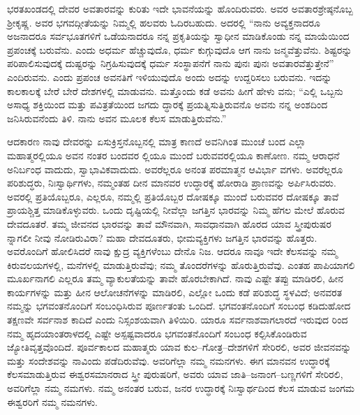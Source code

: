 ಭರತಖಂಡದಲ್ಲಿ ದೇವರ ಅವತಾರವನ್ನು ಕುರಿತು ಇದೇ ಭಾವನೆಯನ್ನು ಹೊಂದಿರುವರು. ಅವರ ಅವತಾರಶ್ರೇಷ್ಠನೊಬ್ಬ ಶ‍್ರೀಕೃಷ್ಣ. ಅವರ ಭಗವದ್ಗೀತೆಯನ್ನು ನಿಮ್ಮಲ್ಲಿ ಹಲವರು ಓದಿರಬಹುದು. ಅದರಲ್ಲಿ “ನಾನು ಅವ್ಯಕ್ತನಾದರೂ ಅಜನಾದರೂ ಸರ್ವಭೂತಗಳಿಗೆ ಒಡೆಯನಾದರೂ ನನ್ನ ಪ್ರಕೃತಿಯನ್ನು ಸ್ವಾಧೀನ ಮಾಡಿಕೊಂಡು ನನ್ನ ಮಾಯೆಯಿಂದ ಪ್ರಪಂಚಕ್ಕೆ ಬರುವೆನು. ಎಂದು ಅಧರ್ಮ ಹೆಚ್ಚುವುದೊ, ಧರ್ಮ ಕುಗ್ಗುವುದೊ ಆಗ ನಾನು ಜನ್ಮವೆತ್ತುವೆನು. ಶಿಷ್ಟರನ್ನು ಪರಿಪಾಲಿಸುವುದಕ್ಕೆ ದುಷ್ಟರನ್ನು ನಿಗ್ರಹಿಸುವುದಕ್ಕೆ ಧರ್ಮ ಸಂಸ್ಥಾಪನೆಗೆ ನಾನು ಪುನಃ ಪುನಃ ಅವತಾರವೆತ್ತುತ್ತೇನೆ” ಎಂದಿರುವನು. ಎಂದು ಪ್ರಪಂಚ ಅವನತಿಗೆ ಇಳಿಯುವುದೊ ಅಂದು ಅದನ್ನು ಉದ್ದರಿಸಲು ಬರುವನು. ಇದನ್ನು ಕಾಲಕಾಲಕ್ಕೆ ಬೇರೆ ಬೇರೆ ದೇಶಗಳಲ್ಲಿ ಮಾಡುವನು. ಮತ್ತೊಂದು ಕಡೆ ಅವನು ಹೀಗೆ ಹೇಳು ವನು; “ಎಲ್ಲಿ ಒಬ್ಬನು ಅಸಾಧ್ಯ ಶಕ್ತಿಯಿಂದ ಮತ್ತು ಪವಿತ್ರತೆಯಿಂದ ಜಗದು ದ್ಧಾರಕ್ಕೆ ಪ್ರಯತ್ನಿಸುತ್ತಿರುವನೊ ಅವನು ನನ್ನ ಅಂಶದಿಂದ ಜನಿಸಿರುವನೆಂದು ತಿಳಿ. ನಾನು ಅವನ ಮೂಲಕ ಕೆಲಸ ಮಾಡುತ್ತಿರುವೆನು.”

ಆದಕಾರಣ ನಾವು ದೇವರನ್ನು ಏಸುಕ್ರಿಸ್ತನೊಬ್ಬನಲ್ಲಿ ಮಾತ್ರ ಕಾಣದೆ ಅವನಿಗಿಂತ ಮುಂಚೆ ಬಂದ ಎಲ್ಲಾ ಮಹಾತ್ಮರಲ್ಲಿಯೂ ಅವನ ನಂತರ ಬಂದವರ ಲ್ಲಿಯೂ ಮುಂದೆ ಬರುವವರಲ್ಲಿಯೂ ಕಾಣೋಣ. ನಮ್ಮ ಆರಾಧನೆ ಅನಿರ್ಬಂಧ ವಾದುದು, ಸ್ವಾಭಾವಿಕವಾದುದು. ಅವರೆಲ್ಲರೂ ಅನಂತ ಪರಮಾತ್ಮನ ಆವಿರ್ಭಾ ವಗಳು. ಅವರೆಲ್ಲರೂ ಪರಿಶುದ್ಧರು, ನಿಃಸ್ವಾರ್ಥಿಗಳು, ನಮ್ಮಂತಹ ದೀನ ಮಾನವರ ಉದ್ಧಾರಕ್ಕೆ ಹೋರಾಡಿ ಪ್ರಾಣವನ್ನು ಅರ್ಪಿಸಿರುವರು. ಅವರಲ್ಲಿ ಪ್ರತಿಯೊಬ್ಬರೂ, ಎಲ್ಲರೂ, ನಮ್ಮಲ್ಲಿ ಪ್ರತಿಯೊಬ್ಬರ ದೋಷಕ್ಕೂ ಮುಂದೆ ಬರುವವರ ದೋಷಕ್ಕೂ ತಾವೆ ಪ್ರಾಯಶ್ಚಿತ್ತ ಮಾಡಿಕೊಳ್ಳುವರು. ಒಂದು ದೃಷ್ಟಿಯಲ್ಲಿ ನೀವೆಲ್ಲಾ ಜಗತ್ತಿನ ಭಾರವನ್ನು ನಿಮ್ಮ ಹೆಗಲ ಮೇಲೆ ಹೊರುವ ದೇವದೂತರೆ. ತಮ್ಮ ಜೀವನದ ಭಾರವನ್ನು ತಾವೆ ಮೌನವಾಗಿ, ಸಾವಧಾನವಾಗಿ ಹೊರದ ಯಾವ ಸ್ತ್ರೀಪುರುಷರ ನ್ನಾಗಲೀ ನೀವು ನೋಡಿರುವಿರಾ? ಮಹಾ ದೇವದೂತರು, ಭೀಮವ್ಯಕ್ತಿಗಳು ಜಗತ್ತಿನ ಭಾರವನ್ನು ಹೊತ್ತರು. ಅವರೊಂದಿಗೆ ಹೋಲಿಸಿದರೆ ನಾವು ಕ್ಷುದ್ರ ವ್ಯಕ್ತಿಗಳೆಂಬು ದೇನೊ ನಿಜ. ಆದರೂ ನಾವೂ ಇದೇ ಕೆಲಸವನ್ನು ನಮ್ಮ ಕಿರುವಲಯಗಳಲ್ಲಿ, ಮನೆಗಳಲ್ಲಿ ಮಾಡುತ್ತಿರುವೆವು; ನಮ್ಮ ತೊಂದರೆಗಳನ್ನು ಹೊರುತ್ತಿರುವೆವು. ಎಂತಹ ಪಾಪಿಯಾಗಲಿ ಮೂರ್ಖನಾಗಲಿ ಎಲ್ಲರೂ ತಮ್ಮ ವ್ಯಾಕುಲತೆಯನ್ನು ತಾವೇ ಹೊರಬೇಕಾಗಿದೆ. ನಾವು ಎಷ್ಟೇ ತಪ್ಪು ಮಾಡಿರಲಿ, ಹೀನ ಕಾರ್ಯಗಳನ್ನು ಮತ್ತು ಹೀನ ಆಲೋಚನೆಗಳನ್ನು ಮಾಡಿರಲಿ, ಎಲ್ಲೋ ಒಂದು ಕಡೆ ಪರಿಶುದ್ಧ ಸ್ಥಳವಿದೆ; ಅನವರತ ನಮ್ಮನ್ನು ಭಗವಂತ\-ನೊಂದಿಗೆ ಸಂಬಂಧಿಸಿರುವ ಪೂರ್ಣತಂತು ಒಂದಿದೆ. ಭಗವಂತನೊಂದಿಗೆ ಸಂಬಂಧ ಕಡಿದುಹೋದ ತಕ್ಷಣವೇ ಸರ್ವನಾಶ ಕಾದಿದೆ ಎಂದು ನಿಸ್ಸಂಶಯವಾಗಿ ತಿಳಿಯಿರಿ. ಯಾರೂ ಸರ್ವನಾಶವಾಗಲಾರದೆ ಇರುವುದ ರಿಂದ ನಮ್ಮ ಹೃದಯಾಂತರಾಳದಲ್ಲಿ ಎಷ್ಟೇ ಅಸ್ಪಷ್ಟವಾದರೂ ಭಗವಂತನೊಂದಿಗೆ ಸಂಬಂಧ ಕಲ್ಪಿಸಿಕೊಂಡಿರುವ ಜ್ಯೋತಿವೃತ್ತವೊಂದಿದೆ. ಪೂರ್ವಕಾಲದ ಮಹಾತ್ಮರು ಯಾವ ಕುಲ–ಗೋತ್ರ–ದೇಶಗಳಿಗೆ ಸೇರಿರಲಿ, ಅವರ ಜೀವನವನ್ನು ಮತ್ತು ಸಂದೇಶವನ್ನು ನಾವಿಂದು ಪಡೆದಿರುವೆವು. ಅವರಿಗೆಲ್ಲಾ ನಮ್ಮ ನಮನಗಳು. ಈಗ ಮಾನವನ ಉದ್ಧಾರಕ್ಕೆ ಕೆಲಸಮಾಡುತ್ತಿರುವ ಈಶ್ವರಸಮಾನರಾದ ಸ್ತ್ರೀ ಪುರುಷರಿಗೆ, ಅವರು ಯಾವ ಜಾತಿ–ಜನಾಂಗ–ಬಣ್ಣಗಳಿಗೆ ಸೇರಿರಲಿ, ಅವರಿಗೆಲ್ಲಾ ನಮ್ಮ ನಮಗಳು. ನಮ್ಮ ಅನಂತರ ಬರುವ, ಜನರ ಉದ್ಧಾರಕ್ಕೆ ನಿಃಸ್ವಾರ್ಥದಿಂದ ಕೆಲಸ ಮಾಡುವ ಜಂಗಮ ಈಶ್ವರರಿಗೆ ನಮ್ಮ ನಮನಗಳು.

